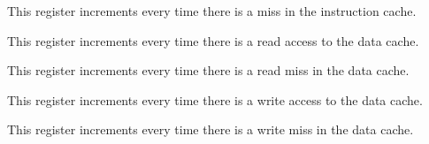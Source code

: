 This register increments every time there is a miss in the instruction cache.

\implementation{}


This register increments every time there is a read access to the data cache.

\implementation{}


This register increments every time there is a read miss in the data cache.

\implementation{}


This register increments every time there is a write access to the data cache.

\implementation{}


This register increments every time there is a write miss in the data cache.

\implementation{}


